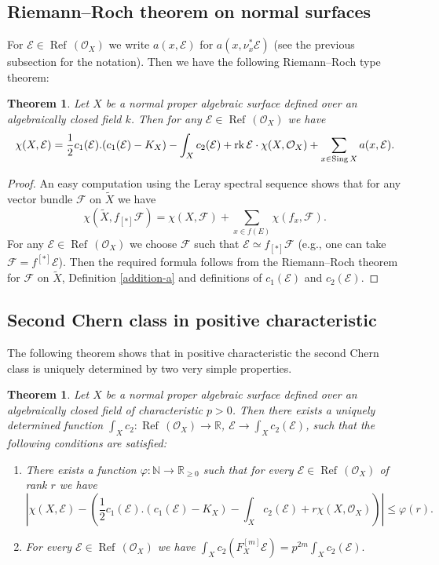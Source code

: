 \documentclass[twoside, 11pt]{article}
\theoremstyle{plain}
\newtheorem{Theorem}[Thm]{\sc Theorem}
\theoremstyle{definition}
\theoremstyle{remark}
\newcommand{\NN}{{\mathbb N}}
\newcommand{\RR}{{\mathbb R}}
\newcommand{\cE}{{\mathcal E}}
\newcommand{\cF}{{\mathcal F}}
\newcommand{\cO}{{\mathcal O}}
\newcommand{\Refl}{{\mathop{\operatorname{Ref}\, }}}
\newcommand{\rk}{{\mathop{\rm rk \,}}}
\newcommand{\Sing}{{\mathop{{\rm Sing \,}}}}
\begin{document}
\subsection{Riemann--Roch theorem on normal surfaces}

For $\cE\in  \Refl(\cO_X)$ we write $a(x, \cE)$ for $ a(x, \nu_x^* \cE)$ (see the previous subsection for the notation).
Then we have the following Riemann--Roch type theorem:

\begin{Theorem}\label{RR-theorem-easy}
Let $X$ be a normal proper algebraic surface defined over an algebraically closed field $k$.
Then for any  $\cE\in \Refl(\cO_X)$
we have 
$$\chi (X, \cE) = \frac {1}{2}c_1 (\cE). (c_1(\cE) -K_X)- \int_Xc_2 (\cE) +\rk \cE\cdot \chi (X, \cO_X)+\sum _{x\in \Sing X} a(x, \cE).$$ 
\end{Theorem}

\begin{proof}
An easy computation using the Leray spectral sequence shows that for any vector bundle $\cF$ 
on $\tilde X$ we have
$$\chi (\tilde X, f_{[*]}\cF)=\chi (X, \cF)+\sum _{x\in f(E)} \chi (f_x, \cF).$$
For any  $\cE\in \Refl(\cO_X)$ we choose $\cF$ such that $\cE\simeq f_{[*]}\cF$ (e.g., one can take $\cF=f^{[*]}\cE$).
Then the required formula follows from the Riemann--Roch theorem for $\cF$ on $\tilde X$, 
Definition \ref{addition-a} and definitions of $c_1(\cE)$ and $c_2(\cE)$.
\end{proof}

\subsection{Second Chern class in positive characteristic}

The following theorem shows that in positive characteristic  
the second Chern class is uniquely determined by two very simple properties.

\begin{Theorem}\label{RR-theorem}
Let $X$ be a normal proper algebraic surface defined over an algebraically closed field of characteristic $p>0$.
Then there exists a uniquely determined function $\int _Xc_2: \Refl(\cO_X) \to \RR$, $\cE\to \int_Xc_2 (\cE)$, such that  the following conditions are satisfied:
\begin{enumerate}
\item  There exists a function $\varphi: \NN\to \RR_{\ge 0}$ such that for every $\cE\in \Refl(\cO_X)$ of rank $r$ we have
$$\left|\chi (X, \cE) -\left(\frac {1}{2}c_1 (\cE). (c_1(\cE) -K_X)- \int_Xc_2 (\cE) +r\chi (X, \cO_X)\right)\right|\le \varphi(r).$$
\item For every $\cE\in \Refl(\cO_X)$  we have $\int _X c_2 (F_X^{[m]} \cE )=p^{2m} \int_Xc_2 (\cE).$
\end{enumerate}
\end{Theorem}
\end{document}
